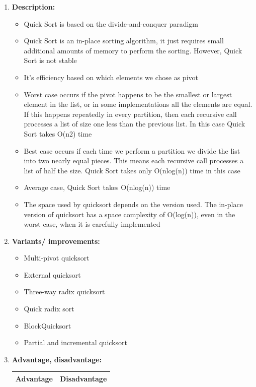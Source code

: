 \documentclass[11pt,a4paper]{article}
\begin{document}
{\begin{enumerate}[label=\textbf{\arabic*})]
				\item \textbf{Description:}
				\begin{itemize}
					\item Quick Sort is based on the divide-and-conquer paradigm
					\item Quick Sort is an in-place sorting algorithm, it just requires small additional amounts of memory to perform the sorting. However, Quick Sort is not stable
					\item It’s efficiency based on which elements we chose as pivot
					\item Worst case occurs if the pivot happens to be the smallest or largest element in the list, or in some implementations all the elements are equal. If this happens repeatedly in every partition, then each recursive call processes a list of size one less than the previous list. In this case Quick Sort takes O(n2) time
					\item Best case occurs if each time we perform a partition we divide the list into two nearly equal pieces. This means each recursive call processes a list of half the size. Quick Sort takes only O(nlog(n)) time in this case
					\item Average case, Quick Sort takes O(nlog(n)) time
					\item The space used by quicksort depends on the version used. The in-place version of quicksort has a space complexity of O(log(n)), even in the worst case, when it is carefully implemented
				\end{itemize}
				\item \textbf{Variants/ improvements:}
					\begin{itemize}
						\item Multi-pivot quicksort
						\item External quicksort
						\item Three-way radix quicksort
						\item Quick radix sort
						\item BlockQuicksort
						\item Partial and incremental quicksort
					\end{itemize}
				\item \textbf{Advantage, disadvantage:}
					\begin{table}[H]
						\centering
						\begin{tabular}{|p{8cm}|p{8cm}|}
							\hline
							\textbf{Advantage} & \textbf{Disadvantage} \\
							\hline
							\hline

\end{tabular}
\end{table}
\end{enumerate}}
\end{document}
